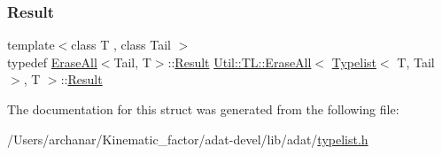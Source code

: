 \subsubsection{\texorpdfstring{Result}{Result}\hspace{0.1cm}{\footnotesize\ttfamily [3/3]}}
{\footnotesize\ttfamily template$<$class T , class Tail $>$ \\
typedef \mbox{\hyperlink{structUtil_1_1TL_1_1EraseAll}{Erase\+All}}$<$Tail, T$>$\+::\mbox{\hyperlink{structUtil_1_1TL_1_1EraseAll_3_01Typelist_3_01T_00_01Tail_01_4_00_01T_01_4_a19df041eef8d861bbb0369642bbd5378}{Result}} \mbox{\hyperlink{structUtil_1_1TL_1_1EraseAll}{Util\+::\+T\+L\+::\+Erase\+All}}$<$ \mbox{\hyperlink{structUtil_1_1Typelist}{Typelist}}$<$ T, Tail $>$, T $>$\+::\mbox{\hyperlink{structUtil_1_1TL_1_1EraseAll_3_01Typelist_3_01T_00_01Tail_01_4_00_01T_01_4_a19df041eef8d861bbb0369642bbd5378}{Result}}}



The documentation for this struct was generated from the following file\+:\begin{DoxyCompactItemize}
\item 
/\+Users/archanar/\+Kinematic\+\_\+factor/adat-\/devel/lib/adat/\mbox{\hyperlink{adat-devel_2lib_2adat_2typelist_8h}{typelist.\+h}}\end{DoxyCompactItemize}
